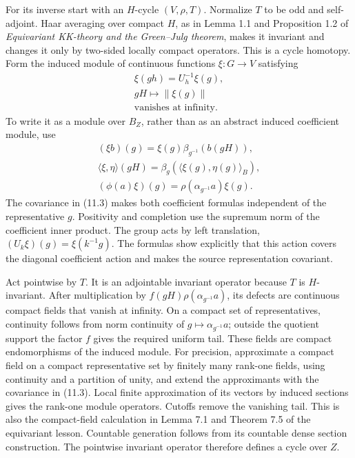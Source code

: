 \documentclass[
  11pt,
]{article}
\begin{document}
For its inverse start with an \(H\)-cycle \((V,\rho,T)\). Normalize
\(T\) to be odd and self-adjoint. Haar averaging over compact \(H\), as
in Lemma 1.1 and Proposition 1.2 of \emph{Equivariant KK-theory and the
Green--Julg theorem}, makes it invariant and changes it only by
two-sided locally compact operators. This is a cycle homotopy. Form the
induced module of continuous functions \(\xi:G\to V\) satisfying \[
\begin{gathered}
\xi(gh)=U_h^{-1}\xi(g),\\
gH\longmapsto\|\xi(g)\|\\
\text{vanishes at infinity}.
\end{gathered}
\tag{11.3}
\] To write it as a module over \(B_Z\), rather than as an abstract
induced coefficient module, use \[
\begin{gathered}
(\xi b)(g)=\xi(g)\beta_{g^{-1}}(b(gH)),\\
\langle\xi,\eta\rangle(gH)
=\beta_g(\langle\xi(g),\eta(g)\rangle_B),\\
(\phi(a)\xi)(g)=\rho(\alpha_{g^{-1}}a)\xi(g).
\end{gathered}
\tag{11.4}
\] The covariance in (11.3) makes both coefficient formulas independent
of the representative \(g\). Positivity and completion use the supremum
norm of the coefficient inner product. The group acts by left
translation, \((U_k\xi)(g)=\xi(k^{-1}g)\). The formulas show explicitly
that this action covers the diagonal coefficient action and makes the
source representation covariant.

Act pointwise by \(T\). It is an adjointable invariant operator because
\(T\) is \(H\)-invariant. After multiplication by
\(f(gH)\rho(\alpha_{g^{-1}}a)\), its defects are continuous compact
fields that vanish at infinity. On a compact set of representatives,
continuity follows from norm continuity of \(g\mapsto\alpha_{g^{-1}}a\);
outside the quotient support the factor \(f\) gives the required uniform
tail. These fields are compact endomorphisms of the induced module. For
precision, approximate a compact field on a compact representative set
by finitely many rank-one fields, using continuity and a partition of
unity, and extend the approximants with the covariance in (11.3). Local
finite approximation of its vectors by induced sections gives the
rank-one module operators. Cutoffs remove the vanishing tail. This is
also the compact-field calculation in Lemma 7.1 and Theorem 7.5 of the
equivariant lesson. Countable generation follows from its countable
dense section construction. The pointwise invariant operator therefore
defines a cycle over \(Z\).
\end{document}
